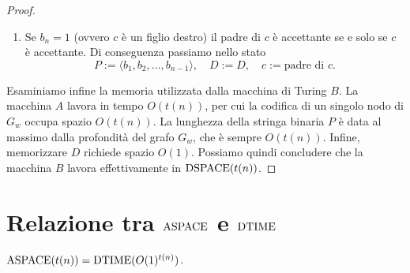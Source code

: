 \begin{proof}
\begin{itemize}
\begin{enumerate}
    \item Se $b_n=1$ (ovvero $c$ è un figlio destro) il padre di $c$ è accettante se e solo se $c$ è accettante.
    Di conseguenza passiamo nello stato
    \[ P := \langle b_1, b_2, \ldots, b_{n-1} \rangle, \quad D := D, \quad c := \text{padre di $c$}. \]
  \end{enumerate}
 \end{itemize}

 Esaminiamo infine la memoria utilizzata dalla macchina di Turing $B$.
 La macchina $A$ lavora in tempo $O(t(n))$, per cui la codifica di un singolo nodo di $G_w$ occupa spazio $O(t(n))$.
 La lunghezza della stringa binaria $P$ è data al massimo dalla profondità del grafo $G_w$, che è sempre $O(t(n))$.
 Infine, memorizzare $D$ richiede spazio $O(1)$.
 Possiamo quindi concludere che la macchina $B$ lavora effettivamente in $\operatorname{DSPACE}(t(n))$.
 
\end{proof}


\section{Relazione tra \texorpdfstring{$\operatorname{ASPACE}$}{ASPACE} e \texorpdfstring{$\operatorname{DTIME}$}{DTIME}}

\begin{teorema}
  \label{thm:aspace-dtime}
  $\operatorname{ASPACE}(t(n)) = \operatorname{DTIME}(O(1)^{t(n)})$.
\end{teorema}

